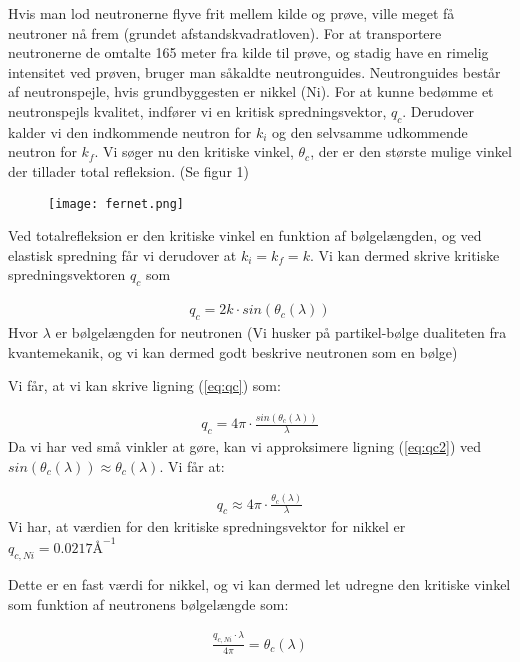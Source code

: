 \documentclass[12pt,oneside,a4paper]{article}
\begin{document}
{{{{{Hvis man lod neutronerne flyve frit mellem kilde og prøve, ville meget få neutroner nå frem (grundet afstandskvadratloven). For at transportere neutronerne de omtalte 165 meter fra kilde til prøve, og stadig have en rimelig intensitet ved prøven, bruger man såkaldte neutronguides. Neutronguides består af neutronspejle, hvis grundbyggesten er nikkel (Ni). For at kunne bedømme et neutronspejls kvalitet, indfører vi en kritisk spredningsvektor, $q_c$. Derudover kalder vi den indkommende neutron for $k_i$ og den selvsamme udkommende neutron for $k_f$. Vi søger nu den kritiske vinkel, $\theta_c$, der er den største mulige vinkel der tillader total refleksion. (Se figur 1)

\begin{figure}[H]
\centering
\texttt{[image: fernet.png]}
\caption{\label{Billede}}
\end{figure}


Ved totalrefleksion er den kritiske vinkel en funktion af bølgelængden, og ved elastisk spredning får vi derudover at $k_i=k_f=k$. Vi kan dermed skrive kritiske spredningsvektoren $q_c$ som

\begin{align} \label{eq:qc}
q_c=2k \cdot sin(\theta_c (\lambda))
\end{align}
Hvor $\lambda$ er bølgelængden for neutronen (Vi husker på partikel-bølge dualiteten fra kvantemekanik, og vi kan dermed godt beskrive neutronen som en bølge)

Vi får, at vi kan skrive ligning (\ref{eq:qc}) som:

\begin{align} \label{eq:qc2}
q_c=4\pi \cdot \frac{sin(\theta_c(\lambda))}{\lambda}
\end{align}
Da vi har ved små vinkler at gøre, kan vi approksimere ligning (\ref{eq:qc2})  ved \\ $sin(\theta_c(\lambda))≈\theta_c(\lambda)$. Vi får at:

\begin{align}
q_c≈4\pi \cdot \frac{\theta_c (\lambda)}{\lambda}
\end{align}
Vi har, at værdien for den kritiske spredningsvektor for nikkel er $q_{c, Ni}=0.0217\text{Å} ^{-1}$ \cite{lefmann_arleth_kirkensgaard_lebech_thomsen}

Dette er en fast værdi for nikkel, og vi kan dermed let udregne den kritiske vinkel som funktion af neutronens bølgelængde som: 

\begin{align}
\frac{q_{c,Ni} \cdot \lambda}{4\pi}=\theta_c(\lambda)
\end{align}

}}}}}
\end{document}
